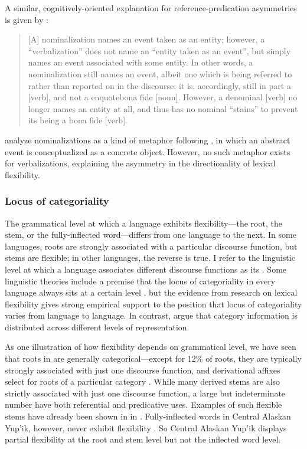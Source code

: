 A similar, cognitively-oriented explanation for reference-predication asymmetries is given by \textcite[745]{HopperThompson1984}:

\blockquote[{\cite[745]{HopperThompson1984}}]{[A] nominalization names an event taken as an entity; however, a \enquote{verbalization} does not name an \enquote{entity taken as an event}, but simply names an event associated with some entity. In other words, a nominalization still names an event, albeit one which is being referred to rather than reported on in the discourse; it is, accordingly, still in part a [verb], and not a enquote{bona fide} [noun]. However, a denominal [verb] no longer names an entity at all, and thus has no nominal \enquote{stains} to prevent its being a bona fide [verb].}

\textcite[746]{HopperThompson1984} analyze nominalizations as a kind of metaphor following \citeauthor[3a]{LakoffJohnson1980}, in which an abstract event is conceptualized as a concrete object. However, no such metaphor exists for verbalizations, explaining the asymmetry in the directionality of lexical flexibility.

\subsubsection{Locus of categoriality}
\label{sec:2.3.2.3}

The grammatical level at which a language exhibits flexibility—the root, the stem, or the fully-inflected word—differs from one language to the next. In some languages, roots are strongly associated with a particular discourse function, but stems are flexible; in other languages, the reverse is true. I refer to the linguistic level at which a language associates different discourse functions as its . Some linguistic theories include a premise that the locus of categoriality in every language always sits at a certain level \parencites{HalleMarantz1994}{Baker2003}{Baker2015}{BooijAudring2018}{Siddiqi2018}, but the evidence from research on lexical flexibility gives strong empirical support to the position that locus of categoriality varies from language to language. In contrast, \textcite{BlaszczakKlimekJankowskaMigdalski2015} argue that category information is distributed across different levels of representation.

As one illustration of how flexibility depends on grammatical level, we have seen that roots in  are generally categorical—except for 12\% of roots, they are typically strongly associated with just one discourse function, and derivational affixes select for roots of a particular category \parencite[162--167]{Mithun2017}. While many derived stems are also strictly associated with just one discourse function, a large but indeterminate number have both referential and predicative uses. Examples of such flexible stems have already been shown in  in . Fully-inflected words in Central Alaskan Yup'ik, however, never exhibit flexibility \parencite[6]{Mithun2019}. So Central Alaskan Yup'ik displays partial flexibility at the root and stem level but not the inflected word level.

